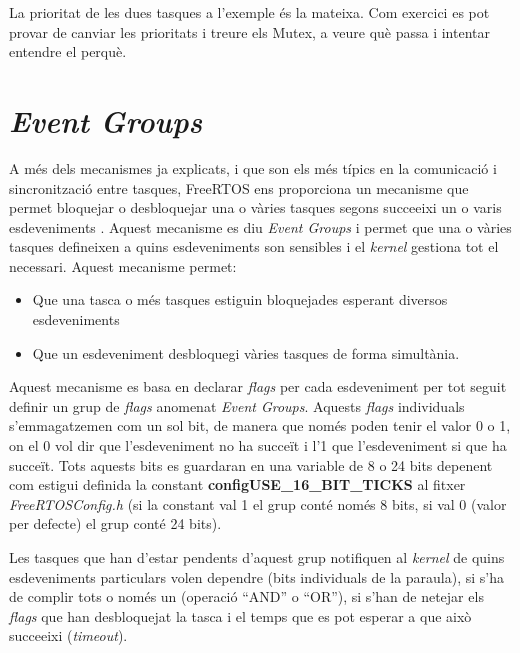 \begin{exercise}
La prioritat de les dues tasques a l'exemple és la mateixa. Com exercici es pot provar de canviar les prioritats i treure els Mutex, a veure què passa i intentar entendre el perquè.
\end{exercise}


\section{\em Event Groups}
A més dels mecanismes ja explicats, i que son els més típics en la comunicació i sincronització entre tasques, FreeRTOS ens proporciona un mecanisme que permet bloquejar o desbloquejar una o vàries tasques segons succeeixi un o varis esdeveniments \cite[266]{FreeRTOSBook}. Aquest mecanisme es diu {\em Event Groups} i permet que una o vàries tasques defineixen a quins esdeveniments son sensibles  i el {\em kernel} gestiona tot el necessari. Aquest mecanisme permet:
\begin{itemize}
 \item Que una tasca o més tasques estiguin bloquejades esperant diversos esdeveniments
 \item Que un esdeveniment desbloquegi vàries tasques de forma simultània.
\end{itemize}


Aquest mecanisme es basa en declarar {\em flags} per cada esdeveniment per tot seguit definir un grup de {\em flags} anomenat {\em Event Groups}. Aquests {\em flags} individuals s'emmagatzemen com un sol bit, de manera que només poden tenir el valor 0 o 1, on el 0 vol dir que l'esdeveniment no ha succeït i l'1 que l'esdeveniment si que ha succeït. Tots aquests bits es guardaran en una variable de 8 o 24 bits depenent com estigui definida la constant {\bf configUSE\_16\_BIT\_TICKS} al fitxer {\em FreeRTOSConfig.h} (si la constant val 1 el grup conté només 8 bits, si val 0 (valor per defecte) el grup conté 24 bits). 

Les tasques que han d'estar pendents d'aquest grup notifiquen al {\em kernel} de quins esdeveniments particulars volen dependre (bits individuals de la paraula), si s'ha de complir tots o només un (operació ``AND'' o ``OR''), si s'han de netejar els {\em flags} que han desbloquejat la tasca i el temps que es pot esperar a que això succeeixi ({\em timeout}).


